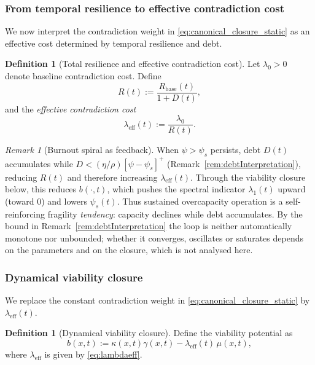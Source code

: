 \documentclass[11pt]{article}
\theoremstyle{plain}
\theoremstyle{definition}
\newtheorem{definition}[theorem]{Definition}
\theoremstyle{remark}
\newtheorem{remark}[theorem]{Remark}
\begin{document}
\subsubsection*{From temporal resilience to effective contradiction cost}
We now interpret the contradiction weight in \eqref{eq:canonical_closure_static} as an effective cost determined by temporal resilience and debt.

\begin{definition}[Total resilience and effective contradiction cost]\label{def:Reff}
Let $\lambda_0>0$ denote baseline contradiction cost. Define
\begin{equation}\label{eq:Rtotal}
R(t):=\frac{R_{\mathrm{base}}(t)}{1+D(t)},
\end{equation}
and the \emph{effective contradiction cost}
\begin{equation}\label{eq:lambdaeff}
\lambda_{\mathrm{eff}}(t):=\frac{\lambda_0}{R(t)}.
\end{equation}
\end{definition}

\begin{remark}[Burnout spiral as feedback]
When $\psi>\psi_s$ persists, debt $D(t)$ accumulates while \(D<(\eta/\rho)[\psi-\psi_s]^+\) (Remark~\ref{rem:debtInterpretation}), reducing $R(t)$ and therefore increasing $\lambda_{\mathrm{eff}}(t)$.
Through the viability closure below, this reduces $b(\cdot,t)$, which pushes the spectral indicator $\lambda_1(t)$ upward (toward $0$) and lowers $\psi_s(t)$.
Thus sustained overcapacity operation is a self-reinforcing fragility \emph{tendency}: capacity declines while debt accumulates. By the bound in Remark~\ref{rem:debtInterpretation} the loop is neither automatically monotone nor unbounded; whether it converges, oscillates or saturates depends on the parameters and on the closure, which is not analysed here.
\end{remark}

\subsubsection*{Dynamical viability closure}
We replace the constant contradiction weight in \eqref{eq:canonical_closure_static} by $\lambda_{\mathrm{eff}}(t)$.

\begin{definition}[Dynamical viability closure]\label{def:dynamical_closure}
Define the viability potential as
\begin{equation}\label{eq:dynamical_closure}
b(x,t):=\kappa(x,t)\gamma(x,t)-\lambda_{\mathrm{eff}}(t)\,\mu(x,t),
\end{equation}
where $\lambda_{\mathrm{eff}}$ is given by \eqref{eq:lambdaeff}.
\end{definition}
\end{document}
